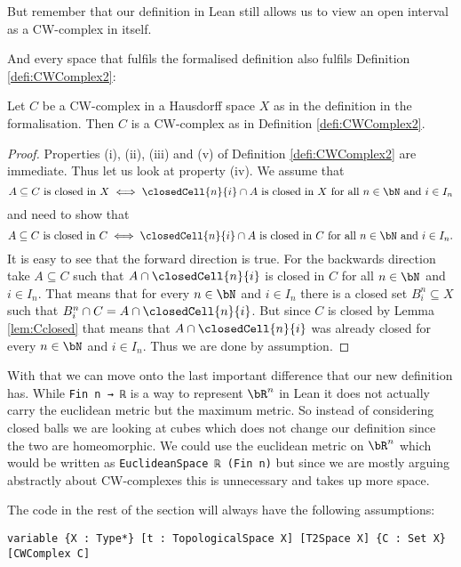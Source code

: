 But remember that our definition in Lean still allows us to view an open interval as a CW-complex in itself.

And every space that fulfils the formalised definition also fulfils Definition \ref{defi:CWComplex2}: 

\begin{lem}
  Let $C$ be a CW-complex in a Hausdorff space $X$ as in the definition in the formalisation. 
  Then $C$ is a CW-complex as in Definition \ref{defi:CWComplex2}. 
\end{lem}
\begin{proof}
  Properties (i), (ii), (iii) and (v) of Definition \ref{defi:CWComplex2} are immediate. 
  Thus let us look at property (iv). 
  We assume that 
  \[A \subseteq C \text{ is closed in } X \iff \closedCell{n}{i} \cap A \text{ is closed in } X \text{ for all } n \in \bN \text{ and } i \in I_n\]
  and need to show that 
  \[A \subseteq C \text{ is closed in } C \iff \closedCell{n}{i} \cap A \text{ is closed in } C \text{ for all } n \in \bN \text{ and } i \in I_n.\]
  It is easy to see that the forward direction is true. 
  For the backwards direction take $A \subseteq C$ such that $A \cap \closedCell{n}{i}$ is closed in $C$ for all $n \in \bN$ and $i \in I_n$. 
  That means that for every $n \in \bN$ and $i \in I_n$ there is a closed set $B_i^n \subseteq X$ such that $B^n_i \cap C = A \cap \closedCell{n}{i}$. 
  But since $C$ is closed by Lemma \ref{lem:Cclosed} that means that $A \cap \closedCell{n}{i}$ was already closed for every $n \in \bN$ and $i \in I_n$. 
  Thus we are done by assumption.
\end{proof}

With that we can move onto the last important difference that our new definition has. 
While \lstinline{Fin n → ℝ} is a way to represent $\bR^n$ in Lean it does not actually carry the euclidean metric but the maximum metric.
So instead of considering closed balls we are looking at cubes which does not change our definition since the two are homeomorphic. 
We could use the euclidean metric on $\bR^n$ which would be written as \lstinline{EuclideanSpace ℝ (Fin n)} but since we are mostly arguing abstractly about CW-complexes this is unnecessary and takes up more space. 

The code in the rest of the section will always have the following assumptions: 

\begin{lstlisting}
variable {X : Type*} [t : TopologicalSpace X] [T2Space X] {C : Set X} [CWComplex C]
\end{lstlisting}


